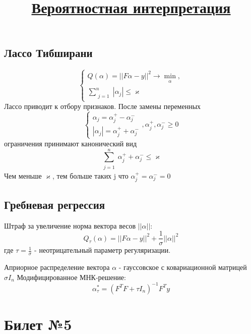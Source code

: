 \documentclass[a4paper]{article}
\theoremstyle{plain}
\theoremstyle{remark}
\theoremstyle{definition}
\renewcommand{\leq}{\leqslant}
\renewcommand{\geq}{\geqslant}
\newcommand{\bigtitle}[1]{\title{\textbf{\underline{#1}}}}
\begin{document}
\subsection{Лассо Тибширани}
$$
\begin{cases}
	Q(\alpha) = ||F\alpha - y||^2 \rightarrow \min_{\substack{\alpha}}, \\
	\sum_{\substack{j=1}}^n|\alpha_j| \leq \varkappa
\end{cases}
$$
Лассо приводит к отбору признаков. После замены переменных
$$ \begin{cases}
	\alpha_j = \alpha_j^+ - \alpha_j^- \\
	|\alpha_j| = \alpha_j^+ + \alpha_j^- 
\end{cases}, \alpha_j^+, \alpha_j^- \geq 0 $$
ограничения принимают канонический вид $$ \sum_{\substack{j=1}}^n \alpha_j^+ + \alpha_j^- \leq \varkappa $$
Чем меньше $\varkappa$, тем больше таких j что $\alpha_j^+ = \alpha_j^- =0$

\subsection{Гребневая регрессия}
Штраф за увеличение норма вектора весов $||\alpha||$:
$$ Q_\tau(\alpha) = ||F\alpha - y||^2 + \frac{1}{\sigma} ||\alpha||^2$$
где $\tau = \frac{1}{\sigma}$ - неотрицательный параметр регуляризации.
\bigtitle{Вероятностная интерпретация}
Априорное распределение вектора $\alpha$ - гауссовское с ковариационной матрицей $\sigma I_n$
Модифицированное МНК-решение: $$ \alpha_\tau^* = (F^{T}F + \tau I_n)^{-1}F^{T}y $$


\section{Билет №5}
\end{document}
